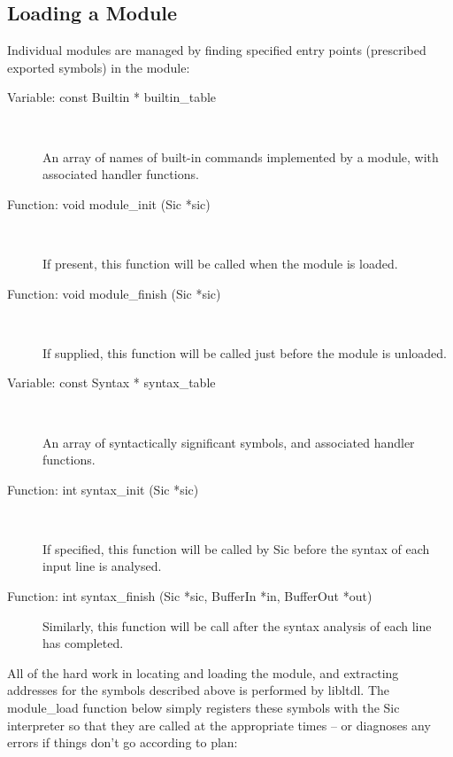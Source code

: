 \subsection{Loading a Module}\label{S_Loading_a_Module}

Individual modules are managed by finding specified entry points (prescribed exported symbols) in the module: 

\begin{description}
\item[Variable: const Builtin * builtin\_{}table]
\

    An array of names of built-in commands implemented by a module, with associated handler functions. 

\item[Function: void module\_{}init (Sic *sic)]
\

    If present, this function will be called when the module is loaded. 

\item[Function: void module\_{}finish (Sic *sic)]
\

If supplied, this function will be called just before the module is unloaded. 

\item[Variable: const Syntax * syntax\_{}table]
\

    An array of syntactically significant symbols, and associated handler functions. 

\item[Function: int syntax\_{}init (Sic *sic)]
\

If specified, this function will be called by Sic before the syntax of each input line is analysed. 

\item[Function: int syntax\_{}finish (Sic *sic, BufferIn *in, BufferOut *out) ]
Similarly, this function will be call after the syntax analysis of each 
line has completed. 
\end{description}

All of the hard work in locating and loading the module, and extracting addresses for the symbols described above is performed by libltdl. The module\_{}load function below simply registers these symbols with the Sic interpreter so that they are called at the appropriate times -- or diagnoses any errors if things don't go according to plan:

